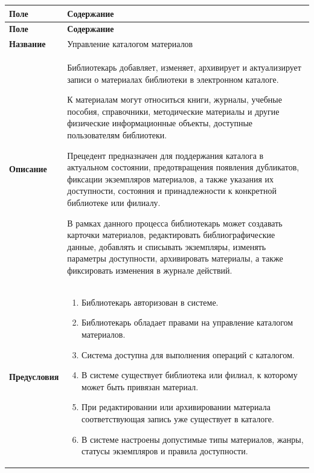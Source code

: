 \documentclass[12pt,a4paper]{article}
\begin{document}
		\begin{xltabular}{\textwidth}{
				|>{\raggedright\arraybackslash}p{2.7cm}
				|>{\raggedright\arraybackslash}X|
			}
			\hline
			\textbf{Поле} & \textbf{Содержание} \\
			\hline
			\endfirsthead
			
			\hline
			\textbf{Поле} & \textbf{Содержание} \\
			\hline
			\endhead
			
			\hline
			\endfoot
			
			\textbf{Название} &
			Управление каталогом материалов \\
			\hline
			
			\textbf{Описание} &
			Библиотекарь добавляет, изменяет, архивирует и актуализирует записи о
			материалах библиотеки в электронном каталоге.
			
			К материалам могут относиться книги, журналы, учебные пособия,
			справочники, методические материалы и другие физические
			информационные объекты, доступные пользователям библиотеки.
			
			Прецедент предназначен для поддержания каталога в актуальном
			состоянии, предотвращения появления дубликатов, фиксации экземпляров
			материалов, а также указания их доступности, состояния и принадлежности
			к конкретной библиотеке или филиалу.
			
			В рамках данного процесса библиотекарь может создавать карточки
			материалов, редактировать библиографические данные, добавлять и
			списывать экземпляры, изменять параметры доступности, архивировать
			материалы, а также фиксировать изменения в журнале действий. \\
			\hline
			
			\textbf{Предусловия} &
			\begin{enumerate}
				\item Библиотекарь авторизован в системе.
				\item Библиотекарь обладает правами на управление каталогом материалов.
				\item Система доступна для выполнения операций с каталогом.
				\item В системе существует библиотека или филиал, к которому может
				быть привязан материал.
				\item При редактировании или архивировании материала соответствующая
				запись уже существует в каталоге.
				\item В системе настроены допустимые типы материалов, жанры, статусы
				экземпляров и правила доступности.
			\end{enumerate} \\
			\hline
			

\end{xltabular}
\end{document}
